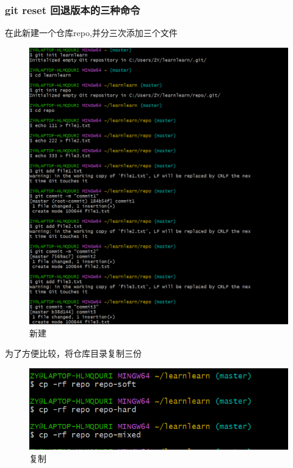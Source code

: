 \documentclass{ctexart}
\begin{document}
	\subsubsection{git reset 回退版本的三种命令}
	在此新建一个仓库repo,并分三次添加三个文件
	\begin{figure}[H]
		\centering
		\includegraphics[scale=0.3]{33}
		\caption{新建}
	\end{figure}
	
	为了方便比较，将仓库目录复制三份
	\begin{figure}[H]
		\centering
		\includegraphics{34}
		\caption{复制}
	\end{figure}
	
\end{document}
